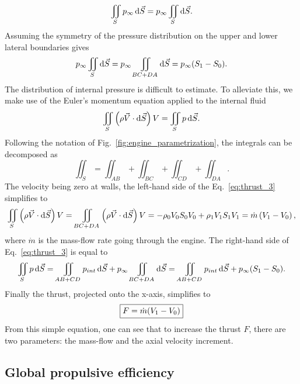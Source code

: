 \begin{equation}
	\iint_{S} p_{\infty} \mathop{}\!\mathrm{d} \vec{S} = 
	p_{\infty} \iint_{S} \mathop{}\!\mathrm{d} \vec{S}.
\end{equation}
Assuming the symmetry of the pressure distribution
on the upper and lower lateral boundaries gives
\begin{equation}
	p_{\infty} \iint_{S} \diff \vec{S} = 
	p_{\infty} \iint_{BC + DA} \diff \vec{S} =
	p_{\infty} (S_{1} - S_{0}).
	\label{eq:thrust_2}
\end{equation}
The distribution of internal pressure is
difficult to estimate. To alleviate this, 
we make use of the Euler’s momentum 
equation applied to the internal fluid
\begin{equation}
	\iint_{S} \left(\rho \vec{V} \cdot \diff \vec{S} \right) V = 
	\iint_{S} p \diff \vec{S}.
	\label{eq:thrust_3}
\end{equation}
Following the notation of Fig.~\ref{fig:engine_parametrization},
the integrals can be decomposed as
\begin{equation}
	\iint_{S} = \iint_{AB} + \iint_{BC} + \iint_{CD} + \iint_{DA}.
\end{equation}
The velocity being zero at walls, 
the left-hand side of the Eq.~\eqref{eq:thrust_3}
simplifies to
\begin{equation}
	\iint_{S} \left(\rho \vec{V} \cdot \mathop{}\!\mathrm{d} \vec{S} \right) V =
	\iint_{BC + DA} \left(\rho \vec{V} \cdot \mathop{}\!\mathrm{d} \vec{S} \right) V =
	- \rho_0 V_0 S_0 V_0 +  \rho_1 V_1 S_1 V_1 = 
	\dot{m} \left( V_{1} - V_{0} \right),
\end{equation}
where $\dot{m}$ is the mass-flow rate going through the engine.
The right-hand side of Eq.~\eqref{eq:thrust_3}
is equal to 
\begin{equation}
	\iint_{S} p \mathop{}\!\mathrm{d} \vec{S} = 
	\iint_{AB + CD} p_{int} \mathop{}\!\mathrm{d} \vec{S} +
	p_{\infty} \iint_{BC + DA} \mathop{}\!\mathrm{d} \vec{S} =
	\iint_{AB + CD} p_{int} \mathop{}\!\mathrm{d} \vec{S} +
	p_{\infty} (S_{1} - S_{0}).
\end{equation}
Finally the thrust, projected onto the x-axis, simplifies to
\begin{equation}
	\fbox{$
	F = \dot{m} (V_{1} - V_{0})
	$}
	\label{eq:cror_thrust}
\end{equation}
From this simple equation,
one can see that to increase the thrust $F$, there are two parameters:
the mass-flow and the axial velocity increment.

\subsection{Global propulsive efficiency}
\label{sub:cror_efficiency}

